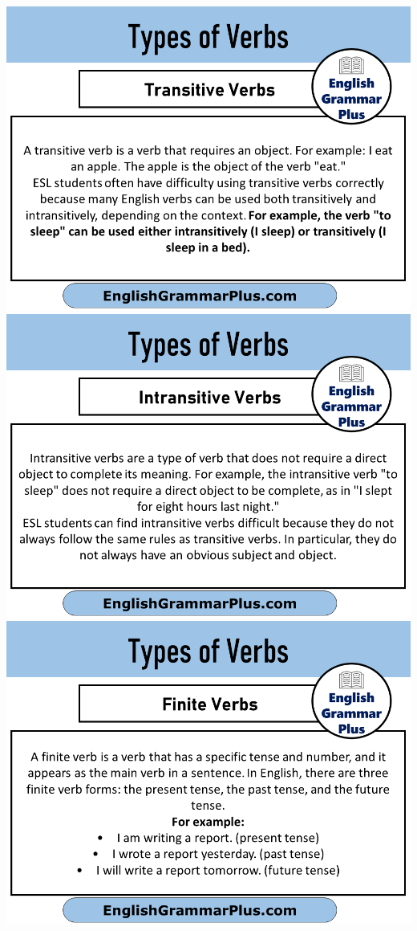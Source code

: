 \includegraphics[scale=0.25]{transitiveVerbs.png}
\includegraphics[scale=0.25]{intransitiveVerbs.png}
\includegraphics[scale=0.25]{finiteVerbs.png}
